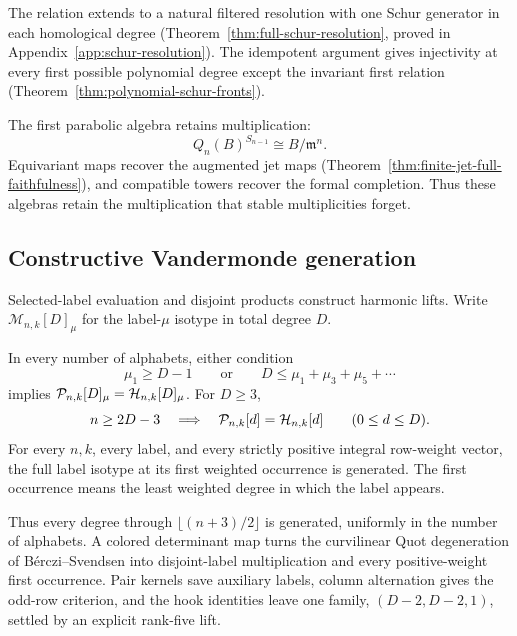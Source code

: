 The relation extends to a natural filtered resolution with one
Schur generator in each homological degree
(Theorem~\ref{thm:full-schur-resolution}, proved in
Appendix~\ref{app:schur-resolution}). The idempotent argument gives
injectivity at every first possible polynomial degree except the
invariant first relation (Theorem~\ref{thm:polynomial-schur-fronts}).

The first parabolic algebra retains multiplication:
\[
                  Q_n(B)^{S_{n-1}}\cong B/\mathfrak m^n.
\]
Equivariant maps recover the augmented jet maps
(Theorem~\ref{thm:finite-jet-full-faithfulness}), and compatible towers
recover the formal completion. Thus these algebras retain the
multiplication that stable multiplicities forget.

\subsection{Constructive Vandermonde generation}

Selected-label evaluation and disjoint products construct harmonic
lifts. Write $\mathcal M_{n,k}[D]_\mu$ for the label-$\mu$ isotype
in total degree $D$.

\begin{maintheorem}
\label{thm:intro-linear}
In every number of alphabets, either condition
\[
 \mu_1\ge D-1
 \qquad\text{or}\qquad
 D\le\mu_1+\mu_3+\mu_5+\cdots
\]
implies $\mathcal P_{n,k}[D]_\mu=\mathcal H_{n,k}[D]_\mu$.
For $D\ge3$,
\begin{equation}\label{eq:intro-linear-range}
 n\ge2D-3
 \quad\Longrightarrow\quad
 \mathcal P_{n,k}[d]=\mathcal H_{n,k}[d]\qquad(0\le d\le D).
\end{equation}
For every $n,k$, every label, and every strictly positive integral
row-weight vector, the full label isotype at its first weighted
occurrence is generated. The first occurrence
means the least weighted degree in which the label appears.
\end{maintheorem}

Thus every degree through $\lfloor(n+3)/2\rfloor$ is generated,
uniformly in the number of alphabets.
A colored determinant map turns the curvilinear Quot degeneration
of B\'erczi--Svendsen \cite{r5-BS} into disjoint-label multiplication
and every positive-weight first occurrence.
Pair kernels save auxiliary labels, column alternation gives the
odd-row criterion, and the hook identities leave one family,
$(D-2,D-2,1)$, settled by an explicit rank-five lift.

